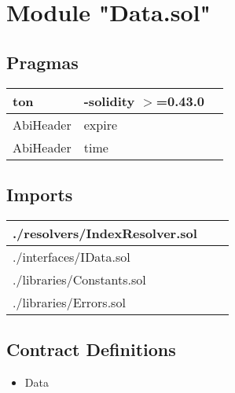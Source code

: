 
\section{Module "Data.sol"}


\subsection{Pragmas}


\noindent\begin{tabular}{|l|l|p{5cm}|}\hline
ton & -solidity $>$=0.43.0 &\\\hline
AbiHeader &  expire &\\\hline
AbiHeader &  time &\\\hline
\end{tabular}


\subsection{Imports}


\noindent\begin{tabular}{|l|l|p{5cm}|}\hline
./resolvers/IndexResolver.sol &\\\hline
./interfaces/IData.sol &\\\hline
./libraries/Constants.sol &\\\hline
./libraries/Errors.sol &\\\hline
\end{tabular}


\subsection{Contract Definitions}

\begin{itemize}
\item Data
\end{itemize}
